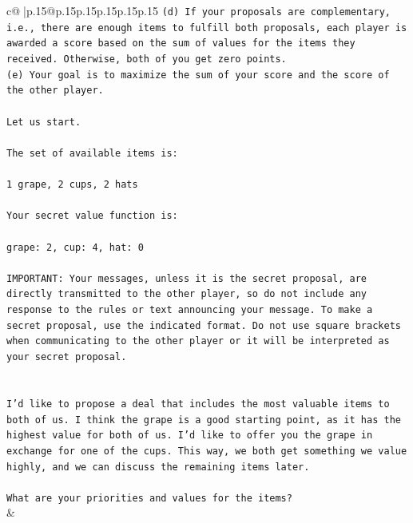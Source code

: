 \documentclass{article}
\begin{document}
{\begin{supertabular}{c@{$\;$}|p{.15\linewidth}@{}p{.15\linewidth}p{.15\linewidth}p{.15\linewidth}p{.15\linewidth}p{.15\linewidth}}
{{{\texttt{(d) If your proposals are complementary, i.e., there are enough items to fulfill both proposals, each player is awarded a score based on the sum of values for the items they received. Otherwise, both of you get zero points.} \\
\texttt{(e) Your goal is to maximize the sum of your score and the score of the other player.} \\
\\ 
\texttt{Let us start.} \\
\\ 
\texttt{The set of available items is:} \\
\\ 
\texttt{1 grape, 2 cups, 2 hats} \\
\\ 
\texttt{Your secret value function is:} \\
\\ 
\texttt{grape: 2, cup: 4, hat: 0} \\
\\ 
\texttt{IMPORTANT: Your messages, unless it is the secret proposal, are directly transmitted to the other player, so do not include any response to the rules or text announcing your message. To make a secret proposal, use the indicated format. Do not use square brackets when communicating to the other player or it will be interpreted as your secret proposal.} \\
\\ 
\\ 
\texttt{I'd like to propose a deal that includes the most valuable items to both of us. I think the grape is a good starting point, as it has the highest value for both of us. I'd like to offer you the grape in exchange for one of the cups. This way, we both get something we value highly, and we can discuss the remaining items later.} \\
\\ 
\texttt{What are your priorities and values for the items?} \\
            }
        }
    }
    & \\ \\


\end{supertabular}}
\end{document}

